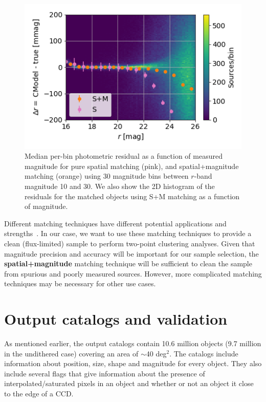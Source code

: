 \documentclass[\docopts]{\docclass}
\begin{document}
\begin{figure}
\centering
\includegraphics[width=0.85\columnwidth]{photometry_residual_comparison}
\caption{Median per-bin photometric residual as a function of measured magnitude for pure spatial matching (pink), and spatial+magnitude matching (orange) using 30 magnitude bins between $r$-band magnitude 10 and 30. We also show the 2D histogram of the residuals for the matched objects using \textsf{S+M} matching as a function of magnitude.}
\label{fig:matching_comparison}
\end{figure}

Different matching techniques have different potential applications and strengths~\citep{doi:10.1146/annurev-statistics-010814-020231}. In our case, we want to use these matching techniques to provide a clean (flux-limited) sample to perform two-point clustering analyses. Given that magnitude precision and accuracy will be important for our sample selection, the \textbf{spatial+magnitude} matching technique will be sufficient to clean the sample from spurious and poorly measured sources. However, more complicated matching techniques may be necessary for other use cases.
 
 
\section{Output catalogs and validation}
\label{sec:catalogs}
As mentioned earlier, the output catalogs contain 10.6 million objects (9.7 million in the undithered case) covering an area
of $\sim$40 deg$^{2}$. The catalogs include information about position, size, shape and magnitude for every object. They also include several flags that give information about the presence of interpolated/saturated pixels in an object and whether or not an object it close to the edge of a CCD.
\end{document}
